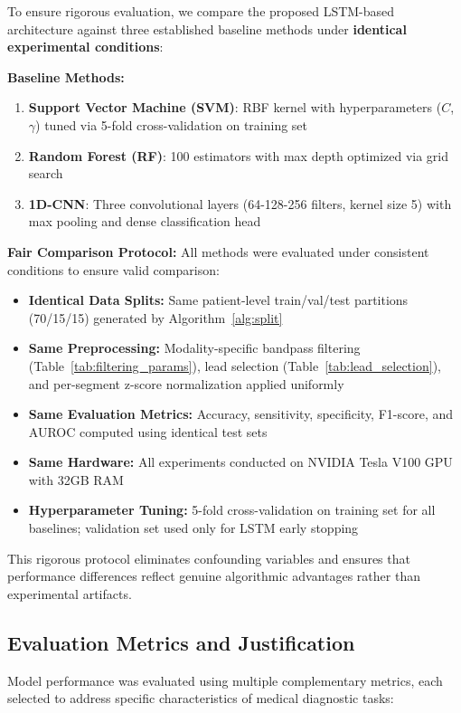 \documentclass[conference]{IEEEtran}
\begin{document}
To ensure rigorous evaluation, we compare the proposed LSTM-based architecture against three established baseline methods under \textbf{identical experimental conditions}:

\textbf{Baseline Methods:}
\begin{enumerate}
\item \textbf{Support Vector Machine (SVM)}: RBF kernel with hyperparameters ($C$, $\gamma$) tuned via 5-fold cross-validation on training set
\item \textbf{Random Forest (RF)}: 100 estimators with max depth optimized via grid search
\item \textbf{1D-CNN}: Three convolutional layers (64-128-256 filters, kernel size 5) with max pooling and dense classification head
\end{enumerate}

\textbf{Fair Comparison Protocol:}
All methods were evaluated under consistent conditions to ensure valid comparison:
\begin{itemize}
\item \textbf{Identical Data Splits:} Same patient-level train/val/test partitions (70/15/15) generated by Algorithm~\ref{alg:split}
\item \textbf{Same Preprocessing:} Modality-specific bandpass filtering (Table~\ref{tab:filtering_params}), lead selection (Table~\ref{tab:lead_selection}), and per-segment z-score normalization applied uniformly
\item \textbf{Same Evaluation Metrics:} Accuracy, sensitivity, specificity, F1-score, and AUROC computed using identical test sets
\item \textbf{Same Hardware:} All experiments conducted on NVIDIA Tesla V100 GPU with 32GB RAM
\item \textbf{Hyperparameter Tuning:} 5-fold cross-validation on training set for all baselines; validation set used only for LSTM early stopping
\end{itemize}

This rigorous protocol eliminates confounding variables and ensures that performance differences reflect genuine algorithmic advantages rather than experimental artifacts.

\subsection{Evaluation Metrics and Justification}

Model performance was evaluated using multiple complementary metrics, each selected to address specific characteristics of medical diagnostic tasks:
\end{document}
